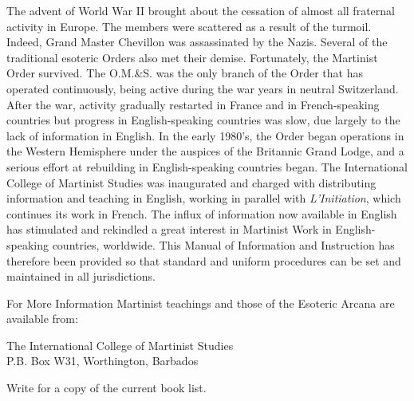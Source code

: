 The advent of World War II brought about the cessation of almost all fraternal
activity in Europe. The members were scattered as a result of the turmoil. Indeed, Grand
Master Chevillon was assassinated by the Nazis. Several of the traditional esoteric Orders
also met their demise. Fortunately, the Martinist Order survived. The O.M.\&S. was the
only branch of the Order that has operated continuously, being active during the war years
in neutral Switzerland. After the war, activity gradually restarted in France and in French-speaking countries but progress in English-speaking countries was slow, due largely to the
lack of information in English. In the early 1980’s, the Order began operations in the
Western Hemisphere under the auspices of the Britannic Grand Lodge, and a serious effort
at rebuilding in English-speaking countries began. The International College of Martinist
Studies was inaugurated and charged with distributing information and teaching in English,
working in parallel with \textit{L’Initiation}, which continues its work in French. The influx of
information now available in English has stimulated and rekindled a great interest in Martinist Work in
English-speaking countries, worldwide. This Manual of Information and Instruction has therefore been
provided so that standard and uniform procedures can be set and maintained in all jurisdictions. 

\begin{paperbox}{For More Information}
    Martinist teachings and those of the Esoteric Arcana are available from:
    
    The International College of Martinist Studies\\
    P.B. Box W31, Worthington, Barbados
    
    Write for a copy of the current book list.
\end{paperbox}